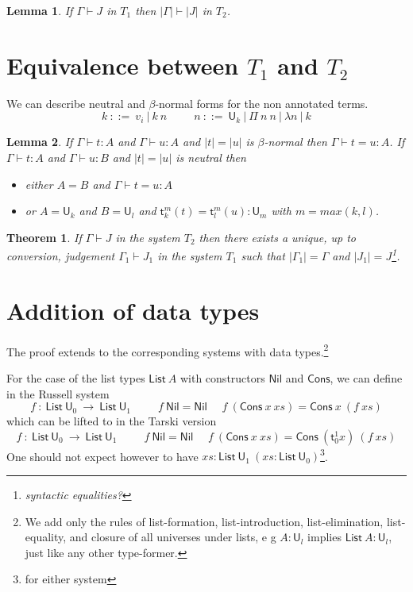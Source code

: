 \documentclass[11pt,a4paper]{article}
\newtheorem{theorem}{Theorem}[section]
\newtheorem{lemma}{Lemma}[theorem]
\theoremstyle{definition}
\def\UU{\mathsf{U}}
\def\List{\mathsf{List}}
\def\Cons{\mathsf{Cons}}
\def\Nil{\mathsf{Nil}}
\newcommand{\sT}{\mathsf{t}}
\begin{document}
\begin{lemma}
  If $\Gamma\vdash J$ in $T_1$ then $|\Gamma|\vdash |J|$ in $T_2$.
\end{lemma}


\section{Equivalence between $T_1$ and $T_2$}

We can describe neutral and $\beta$-normal forms for the non annotated terms.
$$
k~::=~v_i~|~k~n~~~~~~~~~~~n~::=~\UU_k~|~\Pi~n~n~|~\lambda n~|~k
$$


\begin{lemma}
  If $\Gamma\vdash t:A$ and $\Gamma\vdash u:A$ and $|t| = |u|$ is $\beta$-normal then $\Gamma\vdash t = u:A$.
  If $\Gamma\vdash t:A$ and $\Gamma\vdash u:B$ and $|t| = |u|$ is neutral then
  \begin{itemize}
    \item either $A = B$
      and $\Gamma\vdash t = u:A$
    \item or $A = \UU_k$ and $B = \UU_l$ and $\sT_k^m(t) = \sT_l^m(u):\UU_m$ with $m = max(k,l)$.
  \end{itemize}
\end{lemma}

\begin{theorem}\label{equivalence-tarski-russell}
  If $\Gamma\vdash J$ in the system $T_2$ then there exists a unique, up to conversion, judgement $\Gamma_1\vdash J_1$
  in the system $T_1$ such that $|\Gamma_1| = \Gamma$ and $|J_1| = J$\footnote{syntactic equalities?}.
\end{theorem}

\section{Addition of data types}

The proof extends to the corresponding systems with data types.\footnote{We add only the rules of list-formation, list-introduction, list-elimination, list-equality, and closure of all universes under lists, e g $A : \UU_l$ implies $\List~A : \UU_l$, just like any other type-former.}

For the case of the list types $\List~A$ with constructors $\Nil$ and $\Cons$, we can define in the Russell system
$$
f~:~\List~\UU_0~\rightarrow~\List~\UU_1~~~~~~~~~~~
f~\Nil = \Nil~~~~~~f~(\Cons~x~xs) = \Cons~x~(f~xs)
$$
which can be lifted to in the Tarski version
$$
f~:~\List~\UU_0~\rightarrow~\List~\UU_1~~~~~~~~~~~
f~\Nil = \Nil~~~~~~f~(\Cons~x~xs) = \Cons~(\sT_0^1 x)~(f~xs)
$$
One should not expect however to have $xs:\List~\UU_1~(xs:\List~\UU_0)$\footnote{for either system}.
\end{document}
